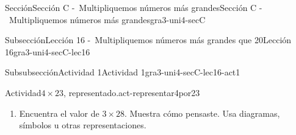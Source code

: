 \documentclass[twoside,10pt,]{article}
\begin{document}
\begin{sectionptx}{Sección}{Sección C -~Multipliquemos números más grandes}{}{Sección C -~Multipliquemos números más grandes}{}{}{gra3-uni4-secC}
\begin{subsectionptx}{Subsección}{Lección 16 -~Multipliquemos números más grandes que 20}{}{Lección 16}{}{}{gra3-uni4-secC-lec16}
\begin{subsubsectionptx}{Subsubsección}{Actividad 1}{}{Actividad 1}{}{}{gra3-uni4-secC-lec16-act1}
\begin{activity}{Actividad}{\(4\times 23\), representado.}{act-representar4por23}
\begin{enumerate}
\begin{sidebyside}{2}{0}{0.3}{0.05}%
\begin{sbspanel}{0.05}[center]%
A%
\end{sbspanel}%
\begin{sbspanel}{0.6}[center]%
\texttt{[image: external/svg-source/tikz-file-152971.pdf]}
\end{sbspanel}%
\end{sidebyside}%
\begin{sidebyside}{2}{0}{0.3}{0.05}%
\begin{sbspanel}{0.05}[center]%
B%
\end{sbspanel}%
\begin{sbspanel}{0.6}[center]%
\texttt{[image: external/svg-source/tikz-file-152972.pdf]}
\end{sbspanel}%
\end{sidebyside}%
\begin{sidebyside}{2}{0}{0.3}{0.05}%
\begin{sbspanel}{0.05}[center]%
C%
\end{sbspanel}%
\begin{sbspanel}{0.6}[center]%
\texttt{[image: external/svg-source/tikz-file-152973.pdf]}
\end{sbspanel}%
\end{sidebyside}%
\begin{sidebyside}{2}{0}{0.3}{0.05}%
\begin{sbspanel}{0.05}[center]%
D%
\end{sbspanel}%
\begin{sbspanel}{0.6}[center]%
\texttt{[image: external/svg-source/tikz-file-152974.pdf]}
\end{sbspanel}%
\end{sidebyside}%
%
\begin{enumerate}
\item{}¿Qué observas sobre los números de sus diagramas?%
\item{}¿Cuál diagrama usarías para encontrar el valor de \(4\times 23\)? Explica tu razonamiento.%
\end{enumerate}
\item{}Encuentra el valor de \(3\times 28\). Muestra cómo pensaste. Usa diagramas, símbolos u otras representaciones.%
\end{enumerate}
\end{activity}%
\end{subsubsectionptx}
%
%
\typeout{************************************************}

\end{subsectionptx}
\end{sectionptx}
\end{document}
